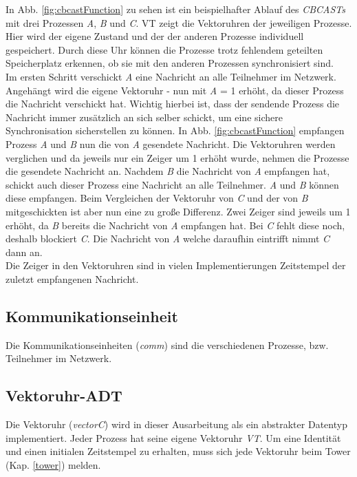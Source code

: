 In Abb. \ref{fig:cbcastFunction} zu sehen ist ein beispielhafter Ablauf des \textit{CBCASTs} mit drei Prozessen \textit{A}, \textit{B} und \textit{C}. VT zeigt die Vektoruhren der jeweiligen Prozesse. Hier wird der eigene Zustand und der der anderen Prozesse individuell gespeichert. Durch diese Uhr können die Prozesse trotz fehlendem geteilten Speicherplatz erkennen, ob sie mit den anderen Prozessen synchronisiert sind.\\
Im ersten Schritt verschickt \textit{A} eine Nachricht an alle Teilnehmer im Netzwerk. Angehängt wird die eigene Vektoruhr - nun mit \textit{A} = 1 erhöht, da dieser Prozess die Nachricht verschickt hat. Wichtig hierbei ist, dass der sendende Prozess die Nachricht immer zusätzlich an sich selber schickt, um eine sichere Synchronisation sicherstellen zu können. In Abb. \ref{fig:cbcastFunction} empfangen Prozess \textit{A} und \textit{B} nun die von \textit{A} gesendete Nachricht. Die Vektoruhren werden verglichen und da jeweils nur ein Zeiger um 1 erhöht wurde, nehmen die Prozesse die gesendete Nachricht an. Nachdem \textit{B} die Nachricht von \textit{A} empfangen hat, schickt auch dieser Prozess eine Nachricht an alle Teilnehmer. \textit{A} und \textit{B} können diese empfangen. Beim Vergleichen der Vektoruhr von \textit{C} und der von \textit{B} mitgeschickten ist aber nun eine zu große Differenz. Zwei Zeiger sind jeweils um 1 erhöht, da \textit{B} bereits die Nachricht von \textit{A} empfangen hat. Bei \textit{C} fehlt diese noch, deshalb blockiert \textit{C}. Die Nachricht von \textit{A} welche daraufhin eintrifft nimmt \textit{C} dann an.\\
Die Zeiger in den Vektoruhren sind in vielen Implementierungen Zeitstempel der zuletzt empfangenen Nachricht.

\subsection{Kommunikationseinheit}

Die Kommunikationseinheiten (\textit{comm}) sind die verschiedenen Prozesse, bzw. Teilnehmer im Netzwerk. %

\subsection{Vektoruhr-ADT}

Die Vektoruhr (\textit{vectorC}) wird in dieser Ausarbeitung als ein abstrakter Datentyp implementiert. Jeder Prozess hat seine eigene Vektoruhr \textit{VT}. Um eine Identität und einen initialen Zeitstempel zu erhalten, muss sich jede Vektoruhr beim Tower (Kap. \ref{tower}) melden.

